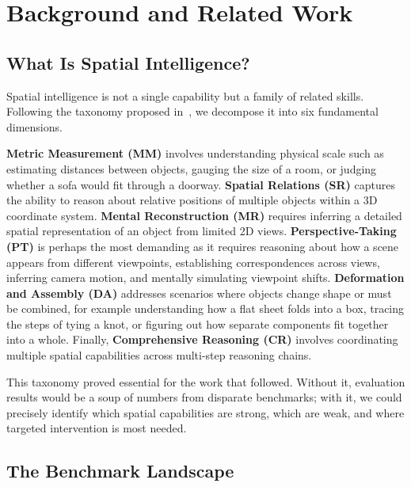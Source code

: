 \chapter{Background and Related Work}
\label{sec:background}

\section{What Is Spatial Intelligence?}

Spatial intelligence is not a single capability but a family of related skills. Following the taxonomy proposed in~\cite{cai2025holisticevaluationmultimodalllms}, we decompose it into six fundamental dimensions.

\textbf{Metric Measurement (MM)} involves understanding physical scale such as estimating distances between objects, gauging the size of a room, or judging whether a sofa would fit through a doorway. \textbf{Spatial Relations (SR)} captures the ability to reason about relative positions of multiple objects within a 3D coordinate system. \textbf{Mental Reconstruction (MR)} requires inferring a detailed spatial representation of an object from limited 2D views. \textbf{Perspective-Taking (PT)} is perhaps the most demanding as it requires reasoning about how a scene appears from different viewpoints, establishing correspondences across views, inferring camera motion, and mentally simulating viewpoint shifts. \textbf{Deformation and Assembly (DA)} addresses scenarios where objects change shape or must be combined, for example understanding how a flat sheet folds into a box, tracing the steps of tying a knot, or figuring out how separate components fit together into a whole. Finally, \textbf{Comprehensive Reasoning (CR)} involves coordinating multiple spatial capabilities across multi-step reasoning chains.

This taxonomy proved essential for the work that followed. Without it, evaluation results would be a soup of numbers from disparate benchmarks; with it, we could precisely identify which spatial capabilities are strong, which are weak, and where targeted intervention is most needed.

\section{The Benchmark Landscape}


